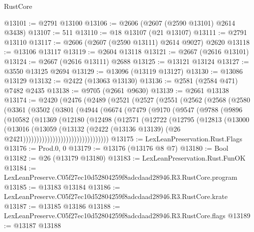 \begin{lexlean}{RustCore}
\begin{coremodule}
@13101 := @2791 @13100
@13106 := @2606 (@2607 (@2590 @13101) @2614 @3438)
@13107 := 511
@13110 := @18 @13107 (@21 @13107)
@13111 := @2791 @13110
@13117 := @2606 (@2607 (@2590 @13111) @2614 @9027) @2620
@13118 := @13106 @13117
@13119 := @2604 @13118
@13121 := @2667 (@2616 @13101)
@13124 := @2667 (@2616 @13111) @2688
@13125 := @13121 @13124
@13127 := @3550 @13125 @2694
@13129 := @13096 (@13119 @13127)
@13130 := @13086 @13129
@13132 := @2422 (@13063 @13130)
@13136 := @2581 (@2584 @471) @7482 @2435
@13138 := @9705 (@2661 @9630)
@13139 := @2661 @13138
@13174 := @2420
    (@2476
      (@2489
        (@2521
          (@2527
            (@2551
              (@2562
                (@2568
                  (@2580
                    (@3361
                      (@3502
                        (@3801
                          (@4944
                            (@6674
                              (@7479
                                (@9170
                                  (@9547
                                    (@9788
                                      (@9896
                                        (@10582
                                          (@11369
                                            (@12180
                                              (@12498
                                                (@12571
                                                  (@12722
                                                    (@12795
                                                      (@12813
                                                        (@13000
                                                          (@13016
                                                            (@13059
                                                              (@13132
                                                                (@2422
                                                                  (@13136 @13139)
                                                                  (@26
                                                                    @2421))))))))))))))))))))))))))))))))
@13175 := LexLeanPreservation.Rust.Flags
@13176 := Prod.{0, 0}
@13179 := @13176 (@13176 @8 @7)
@13180 := Bool
@13182 := @26 (@13179 @13180)
@13183 := LexLeanPreservation.Rust.FunOK
@13184 := LexLeanPreserve.C05f27ec10d52804259f8adcdaad28946.R3.RustCore.program
@13185 := @13183 @13184
@13186 := LexLeanPreserve.C05f27ec10d52804259f8adcdaad28946.R3.RustCore.krate
@13187 := @13185 @13186
@13188 := LexLeanPreserve.C05f27ec10d52804259f8adcdaad28946.R3.RustCore.flags
@13189 := @13187 @13188

\end{coremodule}
\end{lexlean}
